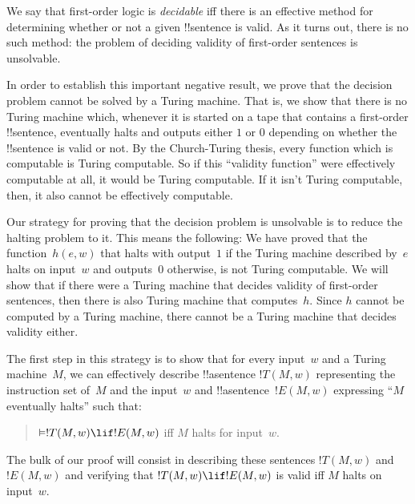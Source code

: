 \documentclass[../../../include/open-logic-section]{subfiles}
\begin{document}

We say that first-order logic is \emph{decidable} iff there is an
effective method for determining whether or not a given !!{sentence}
is valid. As it turns out, there is no such method: the problem of
deciding validity of first-order sentences is unsolvable.

In order to establish this important negative result, we prove that
the decision problem cannot be solved by a Turing machine.  That is,
we show that there is no Turing machine which, whenever it is started
on a tape that contains a first-order !!{sentence}, eventually halts
and outputs either $1$ or $0$ depending on whether the
!!{sentence} is valid or not. By the Church-Turing thesis, every
function which is computable is Turing computable. So if this
``validity function'' were effectively computable at all, it would be
Turing computable. If it isn't Turing computable, then, it also cannot
be effectively computable.

Our strategy for proving that the decision problem is unsolvable is to
reduce the halting problem to it.  This means the following: We have
proved that the function~$h(e,w)$ that halts with output~$1$ if the
Turing machine described by~$e$ halts on input~$w$ and outputs~$0$
otherwise, is not Turing computable.  We will show that if there were
a Turing machine that decides validity of first-order sentences, then
there is also Turing machine that computes~$h$.  Since $h$ cannot be
computed by a Turing machine, there cannot be a Turing machine that
decides validity either.

The first step in this strategy is to show that for every input~$w$
and a Turing machine~$M$, we can effectively describe !!a{sentence}
$!T(M, w)$ representing the instruction set of~$M$ and the input~$w$
and !!a{sentence}~$!E(M, w)$ expressing ``$M$ eventually halts'' such
that:
\begin{quote}
  $\Entails !T(M, w) \lif !E(M,w)$ iff $M$ halts for input~$w$.
\end{quote}
The bulk of our proof will consist in describing these sentences
$!T(M, w)$ and $!E(M, w)$ and verifying that $!T(M, w) \lif !E(M, w)$
is valid iff $M$ halts on input~$w$.
\end{document}
